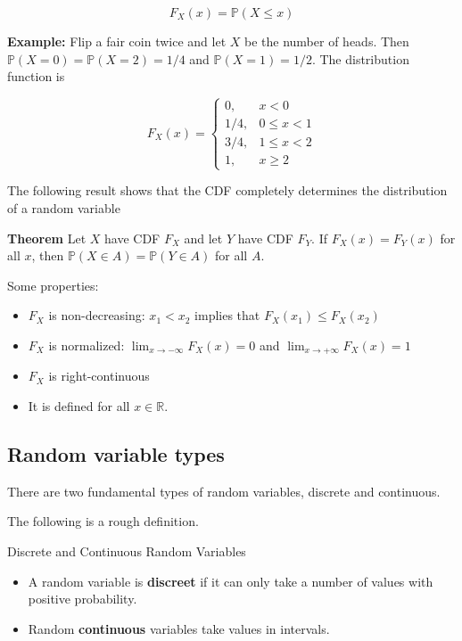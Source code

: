 \documentclass[
]{book}
\providecommand{\tightlist}{%
  \setlength{\itemsep}{0pt}\setlength{\parskip}{0pt}}
\theoremstyle{definition}
\theoremstyle{definition}
\theoremstyle{definition}
\theoremstyle{definition}
\theoremstyle{remark}
\begin{document}
\[
F_X(x)=\mathbb{P}(X\leq x)
\]

\textbf{Example:} Flip a fair coin twice and let \(X\) be the number of heads. Then \(\mathbb{P}(X=0)=\mathbb{P}(X=2)=1/4\) and \(\mathbb{P}(X=1)=1/2\). The distribution function is

\[
F_X(x)=\left\{
\begin{array}{ll}
0, & x<0\\
1/4, & 0\leq x <1\\
3/4, & 1\leq x <2 \\
1, & x\geq 2
\end{array}
\right.
\]

The following result shows that the CDF completely determines the distribution of a random variable

\textbf{Theorem} Let \(X\) have CDF \(F_X\) and let \(Y\) have CDF \(F_Y\). If \(F_X(x)=F_Y(x)\) for all \(x\), then \(\mathbb{P}(X\in A)=\mathbb{P}(Y\in A)\) for all \(A\).

Some properties:

\begin{itemize}
\tightlist
\item
  \(F_X\) is non-decreasing: \(x_1<x_2\) implies that \(F_X(x_1)\leq F_X(x_2)\)
\item
  \(F_X\) is normalized: \(\lim_{x\rightarrow -\infty}F_X(x)=0\) and \(\lim_{x\rightarrow +\infty}F_X(x)=1\)
\item
  \(F_X\) is right-continuous
\item
  It is defined for all \(x\in\mathbb{R}\).
\end{itemize}

\hypertarget{random-variable-types}{%
\subsection{Random variable types}\label{random-variable-types}}

There are two fundamental types of random variables, discrete and continuous.

The following is a rough definition.

Discrete and Continuous Random Variables

\begin{itemize}
\tightlist
\item
  A random variable is \textbf{discreet} if it can only take a number of values with positive probability.
\item
  Random \textbf{continuous} variables take values in intervals.
\end{itemize}
\end{document}
